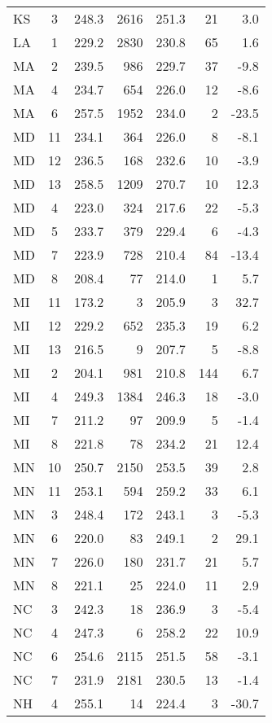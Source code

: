 \begin{longtable}{lcrr@{\extracolsep{10pt}}rr@{\extracolsep{10pt}}r}
  KS & 3 & 248.3 & 2616 & 251.3 & 21 & 3.0 \\ 
  LA & 1 & 229.2 & 2830 & 230.8 & 65 & 1.6 \\ 
  MA & 2 & 239.5 & 986 & 229.7 & 37 & -9.8 \\ 
  MA & 4 & 234.7 & 654 & 226.0 & 12 & -8.6 \\ 
  MA & 6 & 257.5 & 1952 & 234.0 &  2 & -23.5 \\ 
  MD & 11 & 234.1 & 364 & 226.0 &  8 & -8.1 \\ 
  MD & 12 & 236.5 & 168 & 232.6 & 10 & -3.9 \\ 
  MD & 13 & 258.5 & 1209 & 270.7 & 10 & 12.3 \\ 
  MD & 4 & 223.0 & 324 & 217.6 & 22 & -5.3 \\ 
  MD & 5 & 233.7 & 379 & 229.4 &  6 & -4.3 \\ 
  MD & 7 & 223.9 & 728 & 210.4 & 84 & -13.4 \\ 
  MD & 8 & 208.4 & 77 & 214.0 &  1 & 5.7 \\ 
  MI & 11 & 173.2 &  3 & 205.9 &  3 & 32.7 \\ 
  MI & 12 & 229.2 & 652 & 235.3 & 19 & 6.2 \\ 
  MI & 13 & 216.5 &  9 & 207.7 &  5 & -8.8 \\ 
  MI & 2 & 204.1 & 981 & 210.8 & 144 & 6.7 \\ 
  MI & 4 & 249.3 & 1384 & 246.3 & 18 & -3.0 \\ 
  MI & 7 & 211.2 & 97 & 209.9 &  5 & -1.4 \\ 
  MI & 8 & 221.8 & 78 & 234.2 & 21 & 12.4 \\ 
  MN & 10 & 250.7 & 2150 & 253.5 & 39 & 2.8 \\ 
  MN & 11 & 253.1 & 594 & 259.2 & 33 & 6.1 \\ 
  MN & 3 & 248.4 & 172 & 243.1 &  3 & -5.3 \\ 
  MN & 6 & 220.0 & 83 & 249.1 &  2 & 29.1 \\ 
  MN & 7 & 226.0 & 180 & 231.7 & 21 & 5.7 \\ 
  MN & 8 & 221.1 & 25 & 224.0 & 11 & 2.9 \\ 
  NC & 3 & 242.3 & 18 & 236.9 &  3 & -5.4 \\ 
  NC & 4 & 247.3 &  6 & 258.2 & 22 & 10.9 \\ 
  NC & 6 & 254.6 & 2115 & 251.5 & 58 & -3.1 \\ 
  NC & 7 & 231.9 & 2181 & 230.5 & 13 & -1.4 \\ 
  NH & 4 & 255.1 & 14 & 224.4 &  3 & -30.7 \\ 

\end{longtable}
